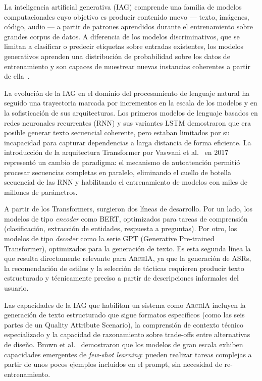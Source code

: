\documentclass[12pt, letterpaper, oneside]{article}
\newcommand{\archia}{\textsc{ArchIA}}
\begin{document}
La inteligencia artificial generativa (IAG) comprende una familia de modelos
computacionales cuyo objetivo es producir contenido nuevo --- texto, imágenes,
código, audio --- a partir de patrones aprendidos durante el entrenamiento sobre
grandes corpus de datos. A diferencia de los modelos discriminativos, que se
limitan a clasificar o predecir etiquetas sobre entradas existentes, los modelos
generativos aprenden una distribución de probabilidad sobre los datos de
entrenamiento y son capaces de muestrear nuevas instancias coherentes a partir de
ella~\cite{zhao2023survey}.

La evolución de la IAG en el dominio del procesamiento de lenguaje natural ha
seguido una trayectoria marcada por incrementos en la escala de los modelos y en
la sofisticación de sus arquitecturas. Los primeros modelos de lenguaje basados en
redes neuronales recurrentes (RNN) y sus variantes LSTM demostraron que era posible
generar texto secuencial coherente, pero estaban limitados por su incapacidad para
capturar dependencias a larga distancia de forma eficiente. La introducción de la
arquitectura Transformer por Vaswani et al.~\cite{vaswani2017attention} en 2017
representó un cambio de paradigma: el mecanismo de autoatención permitió procesar
secuencias completas en paralelo, eliminando el cuello de botella secuencial de las
RNN y habilitando el entrenamiento de modelos con miles de millones de parámetros.

A partir de los Transformers, surgieron dos líneas de desarrollo. Por un lado, los
modelos de tipo \emph{encoder} como BERT, optimizados para tareas de comprensión
(clasificación, extracción de entidades, respuesta a preguntas). Por otro, los
modelos de tipo \emph{decoder} como la serie GPT (Generative Pre-trained
Transformer), optimizados para la generación de texto. Es esta segunda línea la
que resulta directamente relevante para \archia{}, ya que la generación de ASRs,
la recomendación de estilos y la selección de tácticas requieren producir texto
estructurado y técnicamente preciso a partir de descripciones informales del
usuario.

Las capacidades de la IAG que habilitan un sistema como \archia{} incluyen la
generación de texto estructurado que sigue formatos específicos (como las seis
partes de un Quality Attribute Scenario), la comprensión de contexto técnico
especializado y la capacidad de razonamiento sobre trade-offs entre alternativas
de diseño. Brown et al.~\cite{brown2020language} demostraron que los modelos de
gran escala exhiben capacidades emergentes de \emph{few-shot learning}: pueden
realizar tareas complejas a partir de unos pocos ejemplos incluidos en el prompt,
sin necesidad de re-entrenamiento.
\end{document}
